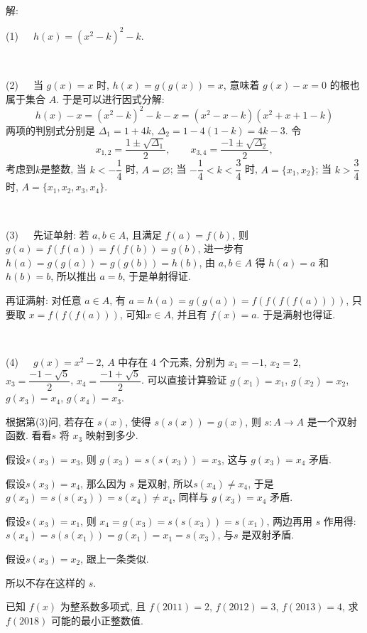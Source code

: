 ~

\noindent 解: 

(1)\ \ \ $h(x) = (x^2-k)^2-k$.

~

(2)\ \ \ 当 $g(x)=x$ 时, $h(x)=g(g(x))=x$, 意味着 $g(x)-x=0$ 的根也属于集合 $A$. 于是可以进行因式分解:
\[ h(x)-x =  (x^2-k)^2-k - x = (x^2-x-k)(x^2+x+1-k) \]
两项的判别式分别是 $\Delta_1 = 1+4k$, $\Delta_2 = 1-4(1-k)=4k-3$. 令
\[x_{1,2}=\frac{1\pm\sqrt{\Delta_1}}{2},\qquad x_{3,4}=\frac{-1\pm\sqrt{\Delta_2}}{2} ,\]
考虑到$k$是整数,
当 $k < -\dfrac{1}{4}$ 时, $A=\varnothing$;
当 $-\dfrac{1}{4} < k < \dfrac{3}{4}$ 时, $A=\{x_1, x_2\}$;
当 $k > \dfrac{3}{4}$ 时, $A=\{x_1, x_2, x_3, x_4\}$.

~

(3)\ \ \ 先证单射: 若 $a,b\in A$, 且满足 $f(a)=f(b)$, 则 $g(a)=f(f(a))=f(f(b))=g(b)$, 进一步有 $h(a)=g(g(a))=g(g(b))=h(b)$, 由 $a,b\in A$ 得 $h(a)=a$ 和 $h(b)=b$, 所以推出 $a=b$, 于是单射得证.

再证满射: 对任意 $a\in A$, 有 $a = h(a)=g(g(a))=f(f(f(f(a))))$, 只要取 $x = f(f(f(a)))$, 可知$x\in A$, 并且有 $f(x)=a$. 于是满射也得证.

~

(4)\ \ \ $g(x)=x^2-2$, $A$ 中存在 4 个元素, 分别为 $x_1 = -1$, $x_2=2$, $x_3=\dfrac{-1-\sqrt{5}}{2}$, $x_4=\dfrac{-1+\sqrt{5}}{2}$. 可以直接计算验证 $g(x_1)=x_1$, $g(x_2)=x_2$, $g(x_3)=x_4$, $g(x_4)=x_3$. 

根据第(3)问, 若存在 $s(x)$, 使得 $s(s(x))=g(x)$, 则 $s: A\rightarrow A$ 是一个双射函数. 看看$s$ 将 $x_3$ 映射到多少. 

假设$s(x_3)=x_3$, 则 $g(x_3)=s(s(x_3))=x_3$, 这与 $g(x_3)=x_4$ 矛盾.

假设$s(x_3)=x_4$, 那么因为 $s$ 是双射, 所以$s(x_4)\ne x_4$, 于是 $g(x_3)=s(s(x_3))=s(x_4)\ne x_4$, 同样与 $g(x_3)=x_4$ 矛盾.

假设$s(x_3)=x_1$, 则 $x_4 = g(x_3)=s(s(x_3))=s(x_1)$, 两边再用 $s$ 作用得: $s(x_4) = s(s(x_1)) = g(x_1)=x_1=s(x_3)$, 与$s$ 是双射矛盾. 

假设$s(x_3)=x_2$, 跟上一条类似.

所以不存在这样的 $s$.


\newpage

已知 $f(x)$ 为整系数多项式, 且 $f(2011) = 2$, $f(2012) = 3$, $f(2013) = 4$, 求 $f(2018)$ 可能的最小正整数值.

~

